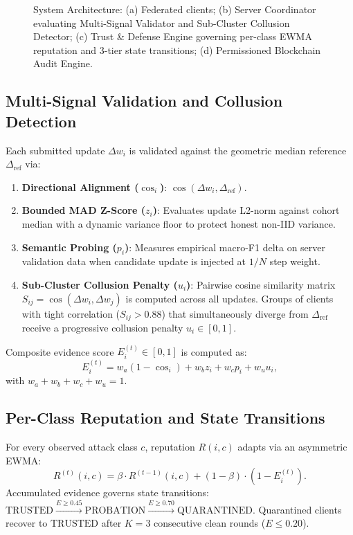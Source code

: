 \documentclass[conference]{IEEEtran}
\begin{document}
\begin{figure}[t]
{\begin{tikzpicture}
\end{tikzpicture}
}
\caption{System Architecture: (a) Federated clients; (b) Server Coordinator evaluating Multi-Signal Validator and Sub-Cluster Collusion Detector; (c) Trust \& Defense Engine governing per-class EWMA reputation and 3-tier state transitions; (d) Permissioned Blockchain Audit Engine.}
\label{fig:architecture}
\end{figure}

\subsection{Multi-Signal Validation and Collusion Detection}
Each submitted update $\Delta w_i$ is validated against the geometric median reference $\Delta_{\text{ref}}$ via:
\begin{enumerate}
    \item \textbf{Directional Alignment ($\cos_i$)}: $\cos(\Delta w_i, \Delta_{\text{ref}})$.
    \item \textbf{Bounded MAD Z-Score ($z_i$)}: Evaluates update L2-norm against cohort median with a dynamic variance floor to protect honest non-IID variance.
    \item \textbf{Semantic Probing ($p_i$)}: Measures empirical macro-F1 delta on server validation data when candidate update is injected at $1/N$ step weight.
    \item \textbf{Sub-Cluster Collusion Penalty ($u_i$)}: Pairwise cosine similarity matrix $S_{ij} = \cos(\Delta w_i, \Delta w_j)$ is computed across all updates. Groups of clients with tight correlation ($S_{ij} > 0.88$) that simultaneously diverge from $\Delta_{\text{ref}}$ receive a progressive collusion penalty $u_i \in [0, 1]$.
\end{enumerate}

Composite evidence score $E_i^{(t)} \in [0, 1]$ is computed as:
\begin{equation}
E_i^{(t)} = w_a(1 - \cos_i) + w_b z_i + w_c p_i + w_u u_i,
\label{eq:evidence}
\end{equation}
with $w_a + w_b + w_c + w_u = 1$.

\subsection{Per-Class Reputation and State Transitions}
For every observed attack class $c$, reputation $R(i, c)$ adapts via an asymmetric EWMA:
\begin{equation}
R^{(t)}(i, c) = \beta \cdot R^{(t-1)}(i, c) + (1 - \beta) \cdot (1 - E_i^{(t)}).
\label{eq:reputation_update}
\end{equation}
Accumulated evidence governs state transitions: $\text{TRUSTED} \xrightarrow{E \ge 0.45} \text{PROBATION} \xrightarrow{E \ge 0.70} \text{QUARANTINED}$. Quarantined clients recover to $\text{TRUSTED}$ after $K=3$ consecutive clean rounds ($E \le 0.20$).
\end{document}
